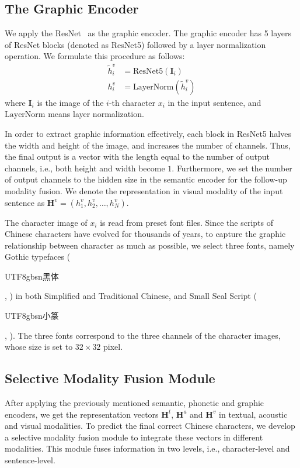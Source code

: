\documentclass[11pt,a4paper]{article}
\newcommand{\cjksong}[1]{{{\begin{CJK*}{UTF8}{gbsn}#1\end{CJK*}}}}
\begin{document}
\subsection{The Graphic Encoder}
We apply the ResNet~\citep{resnet} as the graphic encoder.
The graphic encoder has 5 layers of ResNet blocks (denoted as ResNet5) followed by a layer normalization~\cite{layer_norm} operation.
We formulate this procedure as follows:
\begin{equation}
\begin{split}
    \tilde{h}^v_i &= \textrm{ResNet5}(\mathbf{I}_i) \\
    h^v_i &= \textrm{LayerNorm}(\tilde{h}^v_i)
\end{split}
\end{equation}
where $\mathbf{I}_i$ is the image of the $i$-th character $x_i$ in the input sentence, and $\textrm{LayerNorm}$ means layer normalization.

In order to extract graphic information effectively, each block in ResNet5 halves the width and height of the image, and increases the number of channels. Thus, the final output is a vector with the length equal to the number of output channels, i.e., both height and width become $1$.
Furthermore, we set the number of output channels to the hidden size in the semantic encoder for the follow-up modality fusion. 
We denote the representation in visual modality of the input sentence as $\mathbf{H}^v = (h^v_1, h^v_2, \dots, h^v_N)$.

The character image of $x_i$ is read from preset font files.
Since the scripts of Chinese characters have evolved for thousands of years, to capture the graphic relationship between character as much as possible, we select three fonts, namely Gothic typefaces (\cjksong{黑体}, ) in both Simplified and Traditional Chinese, and Small Seal Script (\cjksong{小篆}, ).
The three fonts correspond to the three channels of the character images, whose size is set to  $32 \times 32$ pixel. 

\subsection{Selective Modality Fusion Module}

After applying the previously mentioned semantic, phonetic and graphic encoders, we get the representation vectors $\mathbf{H}^t$, $\mathbf{H}^a$ and $\mathbf{H}^v$ in textual, acoustic and visual modalities.
To predict the final correct Chinese characters, we develop a selective modality fusion module to integrate these vectors in different modalities.
This module fuses information in two levels, i.e., character-level and sentence-level.
\end{document}
